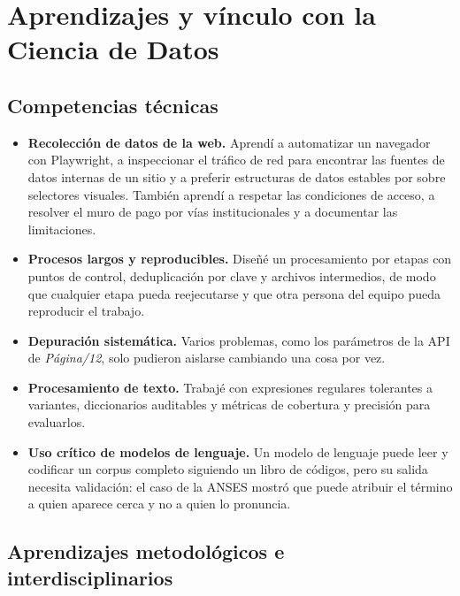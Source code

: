 \documentclass[11pt,a4paper]{article}
\newcommand{\pdoce}{\textit{Página/12}}
\begin{document}
\section{Aprendizajes y vínculo con la Ciencia de Datos}

\subsection{Competencias técnicas}

\begin{itemize}
  \item \textbf{Recolección de datos de la web.} Aprendí a automatizar un navegador con Playwright, a inspeccionar el tráfico de red para encontrar las fuentes de datos internas de un sitio y a preferir estructuras de datos estables por sobre selectores visuales. También aprendí a respetar las condiciones de acceso, a resolver el muro de pago por vías institucionales y a documentar las limitaciones.
  \item \textbf{Procesos largos y reproducibles.} Diseñé un procesamiento por etapas con puntos de control, deduplicación por clave y archivos intermedios, de modo que cualquier etapa pueda reejecutarse y que otra persona del equipo pueda reproducir el trabajo.
  \item \textbf{Depuración sistemática.} Varios problemas, como los parámetros de la API de \pdoce{}, solo pudieron aislarse cambiando una cosa por vez.
  \item \textbf{Procesamiento de texto.} Trabajé con expresiones regulares tolerantes a variantes, diccionarios auditables y métricas de cobertura y precisión para evaluarlos.
  \item \textbf{Uso crítico de modelos de lenguaje.} Un modelo de lenguaje puede leer y codificar un corpus completo siguiendo un libro de códigos, pero su salida necesita validación: el caso de la ANSES mostró que puede atribuir el término a quien aparece cerca y no a quien lo pronuncia.
\end{itemize}

\subsection{Aprendizajes metodológicos e interdisciplinarios}
\end{document}
